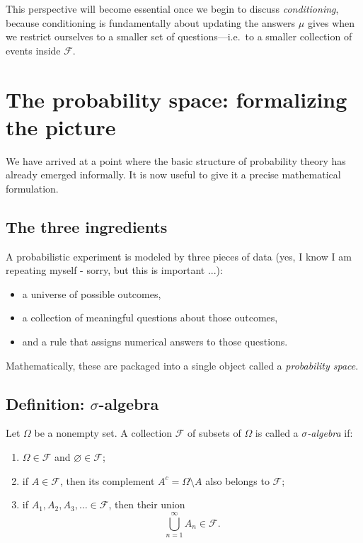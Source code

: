\documentclass[11pt]{article}
\theoremstyle{remark}
\begin{document}
This perspective will become essential once we begin to discuss \emph{conditioning},
because conditioning is fundamentally about updating the answers \(\mu\) gives
when we restrict ourselves to a smaller set of questions—i.e.\ to a smaller
collection of events inside \(\mathcal{F}\).

\section{The probability space: formalizing the picture}

We have arrived at a point where the basic structure of probability theory has
already emerged informally.
It is now useful to give it a precise mathematical formulation.

\subsection{The three ingredients}

A probabilistic experiment is modeled by three pieces of data (yes, I know I am repeating myself - sorry, but this is important ...):
\begin{itemize}
\item a universe of possible outcomes,
\item a collection of meaningful questions about those outcomes,
\item and a rule that assigns numerical answers to those questions.
\end{itemize}

Mathematically, these are packaged into a single object called a
\emph{probability space}.

\medskip

\subsection{Definition: \(\sigma\)-algebra}

Let \(\Omega\) be a nonempty set.
A collection \(\mathcal{F}\) of subsets of \(\Omega\) is called a
\emph{\(\sigma\)-algebra} if:
\begin{enumerate}
\item \(\Omega \in \mathcal{F}\) and \(\varnothing \in \mathcal{F}\);
\item if \(A \in \mathcal{F}\), then its complement \(A^c = \Omega \setminus A\) also belongs to \(\mathcal{F}\);
\item if \(A_1, A_2, A_3, \dots \in \mathcal{F}\), then their union
\[
\bigcup_{n=1}^{\infty} A_n \in \mathcal{F}.
\]
\end{enumerate}
\end{document}
